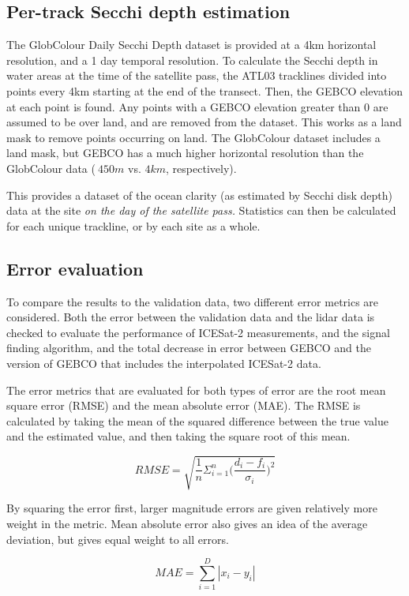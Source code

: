\subsection{Per-track Secchi depth estimation}

The GlobColour Daily Secchi Depth dataset is provided at a 4km horizontal resolution, and a 1 day temporal resolution. To calculate the Secchi depth in water areas at the time of the satellite pass, the ATL03 tracklines divided into points every 4km starting at the end of the transect. Then, the GEBCO elevation at each point is found. Any points with a GEBCO elevation greater than 0 are assumed to be over land, and are removed from the dataset. This works as a land mask to remove points occurring on land. The GlobColour dataset includes a land mask, but GEBCO has a much higher horizontal resolution than the GlobColour data ($~450m$ vs. $4km$, respectively). 

This provides a dataset of the ocean clarity (as estimated by Secchi disk depth) data at the site \emph{on the day of the satellite pass.} Statistics can then be calculated for each unique trackline, or by each site as a whole.


\subsection{Error evaluation}

To compare the results to the validation data, two different error metrics are considered. Both the error between the validation data and the lidar data is checked to evaluate the performance of ICESat-2 measurements, and the signal finding algorithm, and the total decrease in error between GEBCO and the version of GEBCO that includes the interpolated ICESat-2 data. 

The error metrics that are evaluated for both types of error are the root mean square error (RMSE) and the mean absolute error (MAE). The RMSE is calculated by taking the mean of the squared difference between the true value and the estimated value, and then taking the square root of this mean.

$$  RMSE = \sqrt{\frac{1}{n}\Sigma_{i=1}^{n}{\Big(\frac{d_i -f_i}{\sigma_i}\Big)^2}}  $$

By squaring the error first, larger magnitude errors are given relatively more weight in the metric. Mean absolute error also gives an idea of the average deviation, but gives equal weight to all errors.

$$ MAE = \sum_{i=1}^{D}|x_i-y_i| $$

